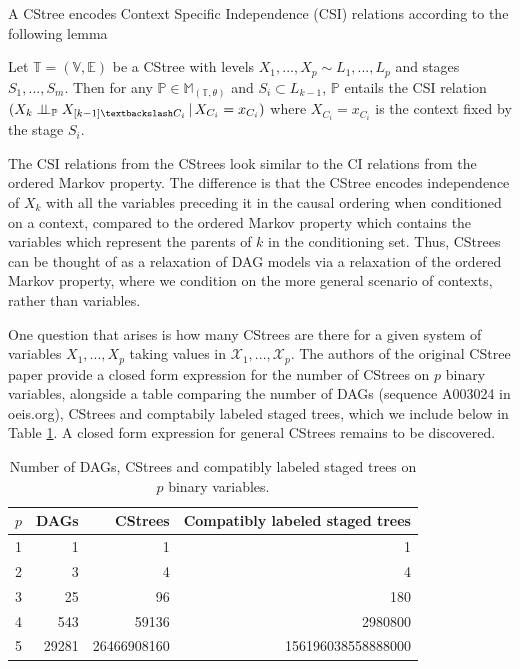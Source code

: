 \documentclass{tufte-book}
\begin{document}
A CStree encodes Context Specific Independence (CSI) relations according to the following lemma \cite{duarte-2021-repres-learn}


\begin{lemma}\label{lem:cstreecsi}

Let $\mathbb{T} = (\mathbb{V},\mathbb{E})$ be a CStree with levels $X_1,...,X_p \sim L_1,...,L_p$ and stages $S_1,...,S_m$. Then for any $\mathbb{P} \in \mathbb{M}_{(\mathbb{T},\theta)}$ and $S_i \subset L_{k-1}$, $\mathbb{P}$ entails the CSI relation $(X_k \indep_{\mathbb{P}} X_{[k-1] \textbackslash C_i} \, | \, X_{C_i} = x_{C_i})$ where $X_{C_i}=x_{C_i}$ is the context fixed by the stage $S_i$.

\end{lemma}

The CSI relations from the CStrees look similar to the CI relations from the ordered Markov property. The difference is that the CStree encodes independence of \(X_k\) with all the variables preceding it in the causal ordering when conditioned on a context, compared to the ordered Markov property which contains the variables which represent the parents of \(k\) in the conditioning set. Thus, CStrees can be thought of as a relaxation of DAG models via a relaxation of the ordered Markov property, where we condition on the more general scenario of contexts, rather than variables. 


One question that arises is how many CStrees are there for a given system of variables \(X_1,...,X_p\) taking values in \(\mathcal{X}_1,...,\mathcal{X}_p\). The authors of the original CStree paper provide a closed form expression for the number of CStrees on \(p\) binary variables, alongside a table comparing the number of DAGs (sequence A003024 in oeis.org), CStrees and comptabily labeled staged trees, which we include below in Table \ref{tab:org0c48599}. A closed form expression for general CStrees remains to be discovered.

\begin{table}[htbp]
\caption{\label{tab:org0c48599}Number of DAGs, CStrees and compatibly labeled staged trees on \(p\) binary variables.}
\centering
\begin{tabular}{rrrr}
\(p\) & DAGs & CStrees & Compatibly labeled staged trees\\
\hline
1 & 1 & 1 & 1\\
2 & 3 & 4 & 4\\
3 & 25 & 96 & 180\\
4 & 543 & 59136 & 2980800\\
5 & 29281 & 26466908160 & 156196038558888000\\
\end{tabular}
\end{table}
\end{document}
